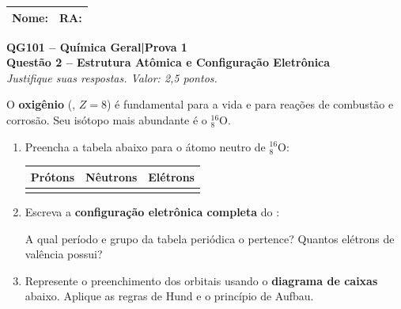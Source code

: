 \documentclass[10pt,a4paper]{article}
\newcommand{\nomera}{%
  \noindent
  \begin{tabular}{|p{0.65\textwidth}|p{0.28\textwidth}|}
    \rule{0pt}{1.8em}Nome:\hfill & RA:\hfill\rule{0pt}{1.8em} \\
    \hline
  \end{tabular}%
  \vspace{0.4cm}
}
\newcommand{\cabecalho}[1]{%
  \begin{center}
    {\large\bfseries QG101 -- Química Geral\quad|\quad Prova 1}\\[2pt]
    {\bfseries #1}\\[2pt]
    \textit{Justifique suas respostas. Valor: 2,5 pontos.}
  \end{center}
  \vspace{0.2cm}
}
\begin{document}
\newpage

\nomera
\cabecalho{Questão 2 -- Estrutura Atômica e Configuração Eletrônica}

O \textbf{oxigênio} (, $Z = 8$) é fundamental para a vida e para
reações de combustão e corrosão. Seu isótopo mais abundante é o
${}^{16}_{8}\text{O}$.

\begin{enumerate}[label=\textbf{\alph*)}]

  \item Preencha a tabela abaixo para o átomo neutro de ${}^{16}_{8}\text{O}$:

        \begin{center}
        \renewcommand{\arraystretch}{1.8}
        \begin{tabular}{|c|c|c|}
          \hline
          \textbf{Prótons} & \textbf{Nêutrons} & \textbf{Elétrons} \\
          \hline
          \hspace{2.5cm} & \hspace{2.5cm} & \hspace{2.5cm} \\
          \hline
        \end{tabular}
        \end{center}

        \vspace{0.3cm}

  \item Escreva a \textbf{configuração eletrônica completa} do :

        \vspace{1.5cm}

        A qual período e grupo da tabela periódica o  pertence?
        Quantos elétrons de valência possui?

        \vspace{1.5cm}

  \item Represente o preenchimento dos orbitais usando o
        \textbf{diagrama de caixas} abaixo.
        Aplique as regras de Hund e o princípio de Aufbau.


\end{enumerate}
\end{document}
